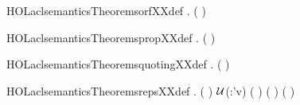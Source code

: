 \begin{SaveVerbatim}{HOLaclsemanticsTheoremsorfXXdef}
\HOLTokenTurnstile{} \HOLSymConst{\HOLTokenForall{}}    .
         (  ) \HOLSymConst{=}      \HOLConst{\HOLTokenUnion{}}     
\end{SaveVerbatim}
\newcommand{\HOLaclsemanticsTheoremsorfXXdef}{\UseVerbatim{HOLaclsemanticsTheoremsorfXXdef}}
\begin{SaveVerbatim}{HOLaclsemanticsTheoremspropXXdef}
\HOLTokenTurnstile{} \HOLSymConst{\HOLTokenForall{}}   .     ( ) \HOLSymConst{=}   
\end{SaveVerbatim}
\newcommand{\HOLaclsemanticsTheoremspropXXdef}{\UseVerbatim{HOLaclsemanticsTheoremspropXXdef}}
\begin{SaveVerbatim}{HOLaclsemanticsTheoremsquotingXXdef}
\HOLTokenTurnstile{} \HOLSymConst{\HOLTokenForall{}}  .   (  ) \HOLSymConst{=}       
\end{SaveVerbatim}
\newcommand{\HOLaclsemanticsTheoremsquotingXXdef}{\UseVerbatim{HOLaclsemanticsTheoremsquotingXXdef}}
\begin{SaveVerbatim}{HOLaclsemanticsTheoremsrepsXXdef}
\HOLTokenTurnstile{} \HOLSymConst{\HOLTokenForall{}}     .
         (   ) \HOLSymConst{=}
     \ensuremath{\cal{U}}(:'v) 
     \HOLTokenLeftbrace{} \HOLTokenBar{}  ( ) (  )  \HOLConst{\HOLTokenSubset{}}     \HOLTokenRightbrace{} \HOLConst{\HOLTokenUnion{}}
     \HOLTokenLeftbrace{} \HOLTokenBar{}  ( )   \HOLConst{\HOLTokenSubset{}}     \HOLTokenRightbrace{}
\end{SaveVerbatim}

